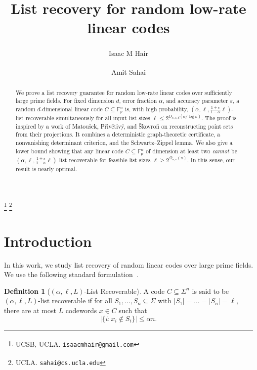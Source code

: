 \documentclass{amsart}
\title[List recovery for random low-rate linear codes]{List recovery for random low-rate linear codes}
\date{}
\makeatletter
\theoremstyle{definition}
\newtheorem{definition}[theorem]{Definition}
\theoremstyle{remark}
\newcommand\thankssymb[1]{\textsuperscript{\@fnsymbol{#1}}}
\newcommand{\Fp}{\mathbb{F}_p}
\makeatother
\begin{document}
\author[Isaac M Hair \and Amit Sahai]{Isaac M Hair\thankssymb{1} \and Amit Sahai\thankssymb{2}}

\thanks{\thankssymb{1} UCSB, UCLA. \texttt{isaacmhair@gmail.com}}
\thanks{\thankssymb{2} UCLA. \texttt{sahai@cs.ucla.edu}}



\begin{abstract}
We prove a list recovery guarantee for random low-rate linear codes over sufficiently large prime fields.  For fixed dimension \(d\), error fraction \(\alpha\), and accuracy parameter \(\varepsilon\), a random \(d\)-dimensional linear code \(C \subseteq \Fp^n\) is, with high probability, \((\alpha,\ell,\frac{1+\varepsilon}{1-\alpha}\ell)\)-list recoverable simultaneously for all input list sizes \(\ell\le 2^{O_{\alpha, \varepsilon, d}(n/\log n)}\). The proof is inspired by a work of Matou\v{s}ek, P\v{r}\'{\i}v\v{e}tiv\'{y}, and \v{S}kovro\v{n} on reconstructing point sets from their projections. It combines a deterministic graph-theoretic certificate, a nonvanishing determinant criterion, and the Schwartz--Zippel lemma.  We also give a lower bound showing that any linear code \(C \subseteq \Fp^n\) of dimension at least two \emph{cannot} be \((\alpha,\ell,\frac{1+\varepsilon}{1-\alpha}\ell)\)-list recoverable for feasible list sizes $\ell \geq 2^{\Omega_{\alpha, \varepsilon}(n)}$. In this sense, our result is nearly optimal.
\end{abstract}

\maketitle




\section{Introduction}

In this work, we study list recovery of random linear codes over large prime fields. We use the following standard formulation~\cite{ReschVenkitesh}.

\begin{definition}[$(\alpha, \ell, L)$-List Recoverable]\label{def:list-recoverable}
    A code $C \subseteq \Sigma^n$ is said to be $(\alpha, \ell, L)$-list recoverable if for all $S_1, \ldots, S_n \subseteq \Sigma$ with $\vert S_1 \vert = \ldots = \vert S_n\vert = \ell$, there are at most $L$ codewords $x \in C$ such that
    \[\vert \{ i : x_i \not\in S_i\}\vert \leq \alpha n.\]
\end{definition}
\end{document}
